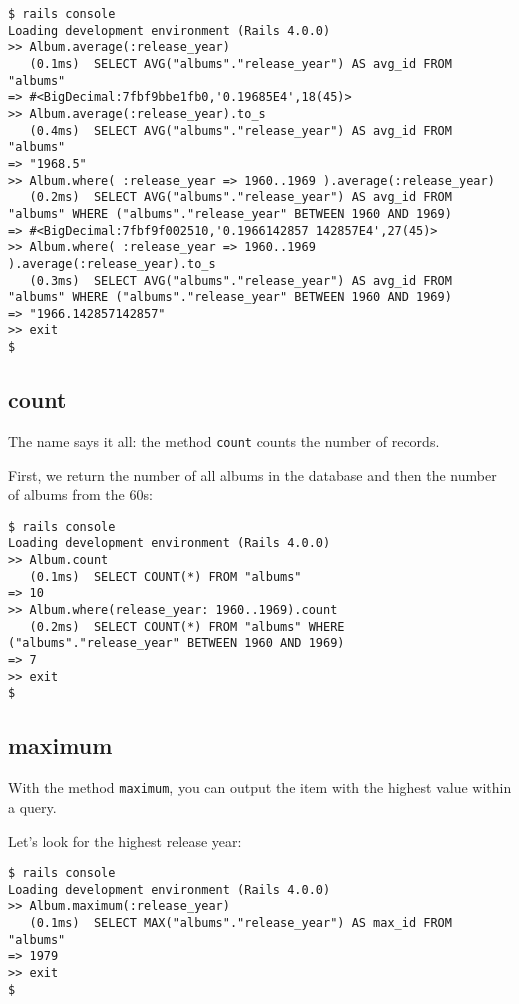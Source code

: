 \documentclass[a4paper]{book}
\newcounter{tab}[chapter]
\begin{document}
\begin{shaded}\begin{verbatim}
$ rails console
Loading development environment (Rails 4.0.0)
>> Album.average(:release_year)
   (0.1ms)  SELECT AVG("albums"."release_year") AS avg_id FROM "albums"
=> #<BigDecimal:7fbf9bbe1fb0,'0.19685E4',18(45)>
>> Album.average(:release_year).to_s
   (0.4ms)  SELECT AVG("albums"."release_year") AS avg_id FROM "albums"
=> "1968.5"
>> Album.where( :release_year => 1960..1969 ).average(:release_year)
   (0.2ms)  SELECT AVG("albums"."release_year") AS avg_id FROM "albums" WHERE ("albums"."release_year" BETWEEN 1960 AND 1969)
=> #<BigDecimal:7fbf9f002510,'0.1966142857 142857E4',27(45)>
>> Album.where( :release_year => 1960..1969 ).average(:release_year).to_s
   (0.3ms)  SELECT AVG("albums"."release_year") AS avg_id FROM "albums" WHERE ("albums"."release_year" BETWEEN 1960 AND 1969)
=> "1966.142857142857"
>> exit
$
\end{verbatim}\end{shaded}

\subsection{count}\label{count}

The name says it all: the method \texttt{count} counts the number of records.

First, we return the number of all albums in the database and then the number of albums from the 60s:

\begin{shaded}\begin{verbatim}
$ rails console
Loading development environment (Rails 4.0.0)
>> Album.count
   (0.1ms)  SELECT COUNT(*) FROM "albums"
=> 10
>> Album.where(release_year: 1960..1969).count
   (0.2ms)  SELECT COUNT(*) FROM "albums" WHERE ("albums"."release_year" BETWEEN 1960 AND 1969)
=> 7
>> exit
$
\end{verbatim}\end{shaded}

\subsection{maximum}\label{maximum}

With the method \texttt{maximum}, you can output the item with the highest value within a query.

Let's look for the highest release year:

\begin{shaded}\begin{verbatim}
$ rails console
Loading development environment (Rails 4.0.0)
>> Album.maximum(:release_year)
   (0.1ms)  SELECT MAX("albums"."release_year") AS max_id FROM "albums"
=> 1979
>> exit
$
\end{verbatim}\end{shaded}
\end{document}
